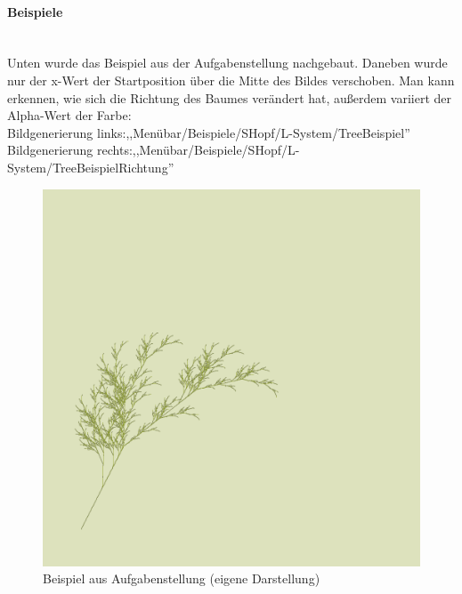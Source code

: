 \documentclass[../mciAusarbeitung.tex]{subfiles}
\begin{document}
		\paragraph{Beispiele}$~$\\
		Unten wurde das Beispiel aus der Aufgabenstellung nachgebaut. Daneben wurde nur der x-Wert der Startposition über die Mitte des Bildes verschoben. Man kann erkennen, wie sich die Richtung des Baumes verändert hat, außerdem variiert der Alpha-Wert der Farbe:\\
		Bildgenerierung links:,,Menübar/Beispiele/SHopf/L-System/TreeBeispiel''\\
		Bildgenerierung rechts:,,Menübar/Beispiele/SHopf/L-System/TreeBeispielRichtung''\\
		\begin{figure}[H]
			\begin{minipage}[t]{0.45\linewidth} 
				\includegraphics[width=\linewidth]{img/treeBeispiel.png}
				\caption[TreeBeispiel]{Beispiel aus Aufgabenstellung (eigene Darstellung)}
			\end{minipage}
			\hfill
			\begin{minipage}[t]{0.45\linewidth} 

\end{minipage}
\end{figure}
\end{document}
